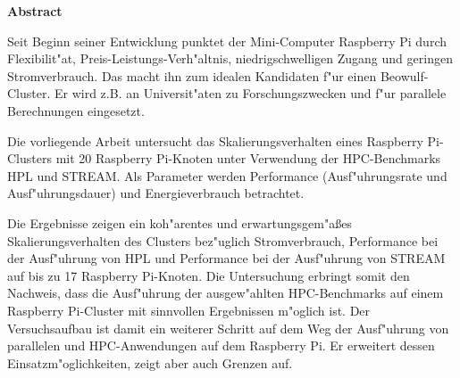 \vspace*{2cm}

\begin{center}
    \textbf{Abstract}
\end{center}

\vspace*{1cm}

\noindent 
Seit Beginn seiner Entwicklung punktet der Mini-Computer Raspberry Pi durch Flexibilit"at, Preis-Leistungs-Verh"altnis, niedrigschwelligen Zugang und geringen Stromverbrauch. Das macht ihn zum idealen Kandidaten f"ur einen Beowulf-Cluster. Er wird z.B. an Universit"aten zu Forschungszwecken und f"ur parallele Berechnungen eingesetzt.  

Die vorliegende Arbeit untersucht das Skalierungsverhalten eines Raspberry Pi-Clusters mit 20 Raspberry Pi-Knoten unter Verwendung der HPC-Benchmarks HPL und STREAM. Als Parameter werden Performance (Ausf"uhrungsrate und Ausf"uhrungsdauer) und Energieverbrauch betrachtet. 

Die Ergebnisse zeigen ein koh"arentes und erwartungsgem"a\ss es Skalierungsverhalten des Clusters bez"uglich Stromverbrauch, Performance bei der Ausf"uhrung von HPL und Performance bei der Ausf"uhrung von STREAM auf bis zu 17 Raspberry Pi-Knoten. Die Untersuchung erbringt somit den Nachweis, dass die Ausf"uhrung der ausgew"ahlten HPC-Benchmarks auf einem Raspberry Pi-Cluster mit sinnvollen Ergebnissen m"oglich ist. Der Versuchsaufbau ist damit ein weiterer Schritt auf dem Weg der Ausf"uhrung von parallelen und HPC-Anwendungen auf dem Raspberry Pi. Er erweitert dessen Einsatzm"oglichkeiten, zeigt aber auch Grenzen auf. 